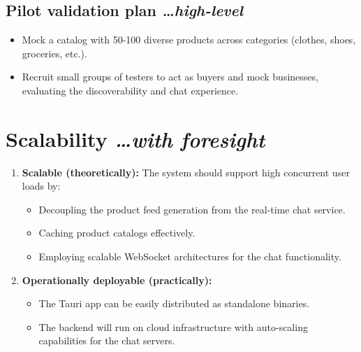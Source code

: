 \documentclass[11pt,a4paper]{article}
\newcommand{\BvrHint}[1]{%
  {\normalfont\normalsize\itshape\hfill #1}}
\begin{document}
\subsection{Pilot validation plan %
\BvrHint{\ldots high-level}}
\begin{itemize}[leftmargin=0.7cm]
    \item Mock a catalog with 50-100 diverse products across categories (clothes, shoes, groceries, etc.).
    \item Recruit small groups of testers to act as buyers and mock businesses, evaluating the discoverability and chat experience.
\end{itemize}

\section{Scalability %
\BvrHint{\ldots with foresight}}
\begin{enumerate}[leftmargin=0.7cm]
    \item \textbf{Scalable (theoretically):} The system should support high concurrent user loads by:
    \begin{itemize}[leftmargin=0.7cm]
        \item Decoupling the product feed generation from the real-time chat service.
        \item Caching product catalogs effectively.
        \item Employing scalable WebSocket architectures for the chat functionality.
    \end{itemize}
    
    \item \textbf{Operationally deployable (practically):}
    \begin{itemize}[leftmargin=0.7cm]
        \item The Tauri app can be easily distributed as standalone binaries.
        \item The backend will run on cloud infrastructure with auto-scaling capabilities for the chat servers.
    \end{itemize}
\end{enumerate}
\end{document}
